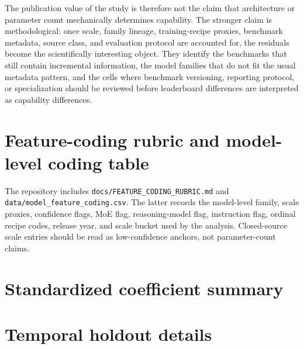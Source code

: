 \documentclass[11pt]{article}
\begin{document}
The publication value of the study is therefore not the claim that architecture or parameter count mechanically determines capability. The stronger claim is methodological: once scale, family lineage, training-recipe proxies, benchmark metadata, source class, and evaluation protocol are accounted for, the residuals become the scientifically interesting object. They identify the benchmarks that still contain incremental information, the model families that do not fit the usual metadata pattern, and the cells where benchmark versioning, reporting protocol, or specialization should be reviewed before leaderboard differences are interpreted as capability differences.
\appendix
\section{Feature-coding rubric and model-level coding table}
The repository includes \texttt{docs/FEATURE\_CODING\_RUBRIC.md} and \texttt{data/model\_feature\_coding.csv}. The latter records the model-level family, scale proxies, confidence flags, MoE flag, reasoning-model flag, instruction flag, ordinal recipe codes, release year, and scale bucket used by the analysis. Closed-source scale entries should be read as low-confidence anchors, not parameter-count claims.

\section{Standardized coefficient summary}
\begin{table}[H]
\centering\scriptsize
\caption{Largest standardized coefficients in the canonical full model. Coefficients are descriptive because predictors are correlated and regularized.}
\resizebox{0.95\textwidth}{!}{\CoefficientTable}
\label{tab:coefficients}
\end{table}

\section{Temporal holdout details}
\begin{table}[H]
\centering\small
\caption{Temporal holdout splits.}
\TemporalTable
\label{tab:temporal}
\end{table}
\end{document}
